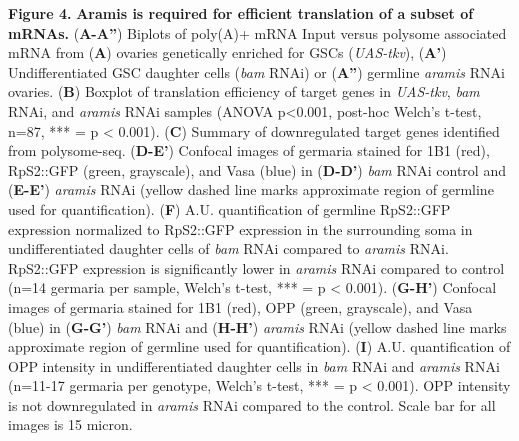 \documentclass[12pt,twoside]{reedthesis}
\begin{document}
\textbf{Figure 4.} \textbf{Aramis is required for efficient translation of a subset
of mRNAs.} (\textbf{A-A''}) Biplots of poly(A)+ mRNA Input versus polysome
associated mRNA from (\textbf{A}) ovaries genetically enriched for GSCs
(\emph{UAS-tkv}), (\textbf{A'}) Undifferentiated GSC daughter cells (\emph{bam} RNAi)
or (\textbf{A''}) germline \emph{aramis} RNAi ovaries. (\textbf{B}) Boxplot of
translation efficiency of target genes in \emph{UAS-tkv}, \emph{bam} RNAi, and
\emph{aramis} RNAi samples (ANOVA p\textless0.001, post-hoc Welch's t-test, n=87,
*** = p \textless{} 0.001). (\textbf{C}) Summary of downregulated target genes
identified from polysome-seq. (\textbf{D-E'}) Confocal images of germaria
stained for 1B1 (red), RpS2::GFP (green, grayscale), and Vasa (blue) in
(\textbf{D-D'}) \emph{bam} RNAi control and (\textbf{E-E'}) \emph{aramis} RNAi (yellow
dashed line marks approximate region of germline used for
quantification). (\textbf{F}) A.U. quantification of germline RpS2::GFP
expression normalized to RpS2::GFP expression in the surrounding soma in
undifferentiated daughter cells of \emph{bam} RNAi compared to \emph{aramis} RNAi.
RpS2::GFP expression is significantly lower in \emph{aramis} RNAi compared to
control (n=14 germaria per sample, Welch's t-test, *** = p \textless{} 0.001).
(\textbf{G-H'}) Confocal images of germaria stained for 1B1 (red), OPP
(green, grayscale), and Vasa (blue) in (\textbf{G-G'}) \emph{bam} RNAi and
(\textbf{H-H'}) \emph{aramis} RNAi (yellow dashed line marks approximate region of
germline used for quantification). (\textbf{I}) A.U. quantification of OPP
intensity in undifferentiated daughter cells in \emph{bam} RNAi and \emph{aramis}
RNAi (n=11-17 germaria per genotype, Welch's t-test, *** = p \textless{}
0.001). OPP intensity is not downregulated in \emph{aramis} RNAi compared to
the control. Scale bar for all images is 15 micron.
\end{document}
